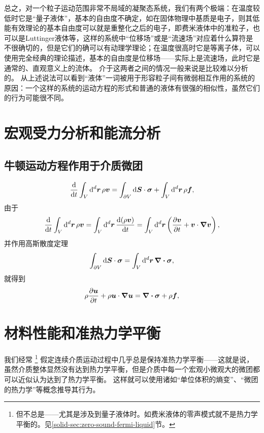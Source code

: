 总之，对一个粒子运动范围非常不局域的凝聚态系统，我们有两个极端：在温度较低时它是“量子液体”，基本的自由度不确定，如在固体物理中基质是电子，则其低能有效理论的基本自由度可以就是重整化之后的电子，即费米液体中的准粒子，也可以是Luttinger液体等，这样的系统中“位移场”或是“流速场”对应着什么算符是不很确切的，但是它们的确可以有动理学理论；在温度很高时它是等离子体，可以使用完全经典的理论描述，基本的自由度是位移场——实际上是流速场，此时它是通常的、直观意义上的流体。
介于这两者之间的情况一般来说是比较难以分析的。
从上述说法可以看到“液体”一词被用于形容粒子间有微弱相互作用的系统的原因：一个这样的系统的运动方程的形式和普通的液体有很强的相似性，虽然它们的行为可能很不同。

\section{宏观受力分析和能流分析}

\subsection{牛顿运动方程作用于介质微团}

\begin{equation}
    \dv{t} \int_V \dd[d]{\vb*{r}} \rho \vb*{v} = \int_{\partial V} \dd{\vb*{S}} \cdot \vb*{\sigma} + \int_V \dd[d]{\vb*{r}} \rho \vb*{f}, 
\end{equation}
由于
\[
    \dv{t} \int_V \dd[d]{\vb*{r}} \rho \vb*{v} = \int_V \dd[d]{\vb*{r}} \dv{(\rho \vb*{v})}{t} = \int_V \dd[d]{\vb*{r}} \left( \pdv{\vb*{v}}{t} + \vb*{v} \cdot \grad \vb*{v} \right),
\]
并作用高斯散度定理
\[
    \int_{\partial V} \dd{\vb*{S}} \cdot \vb*{\sigma} = \int_V \dd[d]{\vb*{r}} \div{\vb*{\sigma}},
\]
就得到
\begin{equation}
    \rho \pdv{\vb*{u}}{t} + \rho \vb*{u} \cdot \grad{\vb*{u}} = \div{\vb*{\sigma}} + \rho \vb*{f},
    \label{eq:newton-continuum}
\end{equation}

\section{材料性能和准热力学平衡}

我们经常%
\footnote{
    但不总是——尤其是涉及到量子液体时。如费米液体的零声模式就不是热力学平衡的。见\ref{solid-sec:zero-sound-fermi-liquid}节。
}%
假定连续介质运动过程中几乎总是保持准热力学平衡——这就是说，虽然介质整体显然没有达到热力学平衡，但是介质中每一个宏观小微观大的微团都可以近似认为达到了热力学平衡。
这样就可以使用诸如“单位体积的熵变”、“微团的热力学”等概念推导其行为。

